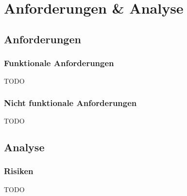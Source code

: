 
\chapter{Anforderungen \& Analyse} \label{ch:anforderungen_section}
\section{Anforderungen}
\subsection{Funktionale Anforderungen}
\begin{flushleft}
TODO
\end{flushleft}
\subsection{Nicht funktionale Anforderungen}
\begin{flushleft}
TODO
\end{flushleft}
\section{Analyse}
\subsection{Risiken}
\begin{flushleft}
TODO
\end{flushleft}